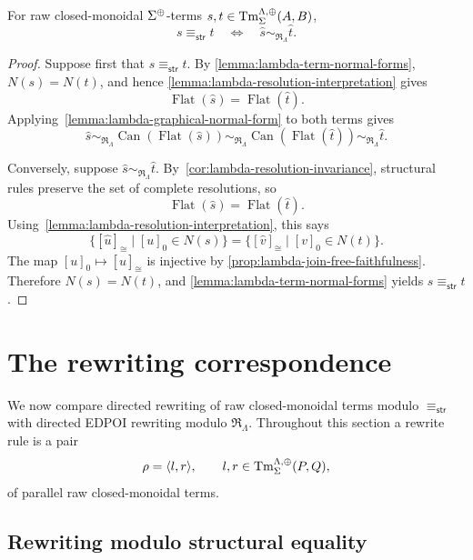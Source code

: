 \begin{theorem}
\label{theorem:lambda-structural-adequacy}
For raw closed-monoidal $\Sigma^{\operatorname{\oplus}}$-terms $s,t \in \operatorname{Tm}^{\Lambda, \operatorname{\oplus}}_{\Sigma}(A, B)$,
\[
 s\equiv_{\mathsf{str}}t
 \quad\Longleftrightarrow\quad
 \widehat s\sim_{\mathfrak R_{\Lambda}}\widehat t.
\]
\end{theorem}
\begin{proof}
Suppose first that $s\equiv_{\mathsf{str}}t$.  By
\cref{lemma:lambda-term-normal-forms}, $N(s)=N(t)$, and hence
\cref{lemma:lambda-resolution-interpretation} gives
\[
 \operatorname{Flat}(\widehat s)
 =\operatorname{Flat}(\widehat t).
\]
Applying~\cref{lemma:lambda-graphical-normal-form} to both terms gives
\[
 \widehat s
 \sim_{\mathfrak R_{\Lambda}}
 \operatorname{Can}(\operatorname{Flat}(\widehat s))
 \sim_{\mathfrak R_{\Lambda}}
 \operatorname{Can}(\operatorname{Flat}(\widehat t))
 \sim_{\mathfrak R_{\Lambda}}
 \widehat t.
\]

Conversely, suppose
$\widehat s\sim_{\mathfrak R_{\Lambda}}\widehat t$. 
By~\cref{cor:lambda-resolution-invariance}, structural rules preserve
the set of complete resolutions, so
\[
 \operatorname{Flat}(\widehat s)
 =\operatorname{Flat}(\widehat t).
\]
Using~\cref{lemma:lambda-resolution-interpretation}, this says
\[
 \bigl\{[\widehat u]_{\cong}\mid[u]_{0}\in N(s)\bigr\}
 =
 \bigl\{[\widehat v]_{\cong}\mid[v]_{0}\in N(t)\bigr\}.
\]
The map $[u]_{0}\mapsto[\widehat u]_{\cong}$ is injective by
\cref{prop:lambda-join-free-faithfulness}.  Therefore $N(s)=N(t)$, and
\cref{lemma:lambda-term-normal-forms} yields
$s\equiv_{\mathsf{str}}t$.
\end{proof}

\section{The rewriting correspondence}
\label{sec:lambda-rewriting-correspondence}

We now compare directed rewriting of raw closed-monoidal terms modulo
$\equiv_{\mathsf{str}}$ with directed EDPOI rewriting modulo
$\mathfrak R_{\Lambda}$.  Throughout this section a rewrite rule is a pair
\[
 \rho=\langle l, r\rangle,
 \qquad
 l,r\in\operatorname{Tm}^{\Lambda,\operatorname{\oplus}}_{\Sigma}(P,Q),
\]
of parallel raw closed-monoidal terms. 
\subsection{Rewriting modulo structural equality}

